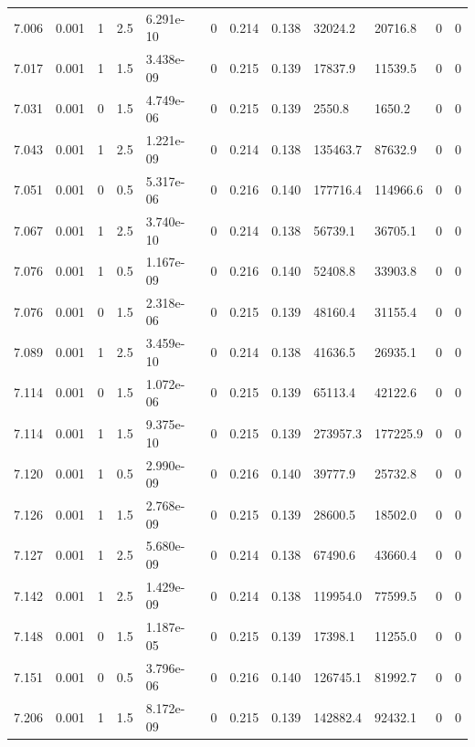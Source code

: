 \documentclass[preview]{standalone}
\begin{document}
{{{{{{{{{{{{\begin{tabular}{L{1.2cm}C{1.2cm} C{0.3cm}C{0.5cm} C{1.4cm}C{1.4cm} C{1.4cm}C{1.4cm} C{1.6cm}C{1.6cm} C{1.6cm}C{1.6cm}}
  7.006  &  0.001  & 1     & 2.5 &  6.291e-10  & 0  &  0.214&   0.138& 32024.2 & 20716.8   &  0 & 0  \\ 
  7.017  &  0.001  & 1     & 1.5 &  3.438e-09  & 0  &  0.215&   0.139& 17837.9 & 11539.5   &  0 & 0  \\ 
  7.031  &  0.001  & 0     & 1.5 &  4.749e-06  & 0  &  0.215&   0.139& 2550.8 & 1650.2   &  0 & 0  \\ 
  7.043  &  0.001  & 1     & 2.5 &  1.221e-09  & 0  &  0.214&   0.138& 135463.7 & 87632.9   &  0 & 0  \\ 
  7.051  &  0.001  & 0     & 0.5 &  5.317e-06  & 0  &  0.216&   0.140& 177716.4 & 114966.6   &  0 & 0  \\ 
  7.067  &  0.001  & 1     & 2.5 &  3.740e-10  & 0  &  0.214&   0.138& 56739.1 & 36705.1   &  0 & 0  \\ 
  7.076  &  0.001  & 1     & 0.5 &  1.167e-09  & 0  &  0.216&   0.140& 52408.8 & 33903.8   &  0 & 0  \\ 
  7.076  &  0.001  & 0     & 1.5 &  2.318e-06  & 0  &  0.215&   0.139& 48160.4 & 31155.4   &  0 & 0  \\ 
  7.089  &  0.001  & 1     & 2.5 &  3.459e-10  & 0  &  0.214&   0.138& 41636.5 & 26935.1   &  0 & 0  \\ 
  7.114  &  0.001  & 0     & 1.5 &  1.072e-06  & 0  &  0.215&   0.139& 65113.4 & 42122.6   &  0 & 0  \\ 
  7.114  &  0.001  & 1     & 1.5 &  9.375e-10  & 0  &  0.215&   0.139& 273957.3 & 177225.9   &  0 & 0  \\ 
  7.120  &  0.001  & 1     & 0.5 &  2.990e-09  & 0  &  0.216&   0.140& 39777.9 & 25732.8   &  0 & 0  \\ 
  7.126  &  0.001  & 1     & 1.5 &  2.768e-09  & 0  &  0.215&   0.139& 28600.5 & 18502.0   &  0 & 0  \\ 
  7.127  &  0.001  & 1     & 2.5 &  5.680e-09  & 0  &  0.214&   0.138& 67490.6 & 43660.4   &  0 & 0  \\ 
  7.142  &  0.001  & 1     & 2.5 &  1.429e-09  & 0  &  0.214&   0.138& 119954.0 & 77599.5   &  0 & 0  \\ 
  7.148  &  0.001  & 0     & 1.5 &  1.187e-05  & 0  &  0.215&   0.139& 17398.1 & 11255.0   &  0 & 0  \\ 
  7.151  &  0.001  & 0     & 0.5 &  3.796e-06  & 0  &  0.216&   0.140& 126745.1 & 81992.7   &  0 & 0  \\ 
  7.206  &  0.001  & 1     & 1.5 &  8.172e-09  & 0  &  0.215&   0.139& 142882.4 & 92432.1   &  0 & 0  \\ 

\end{tabular}}}}}}}}}}}}}
\end{document}
